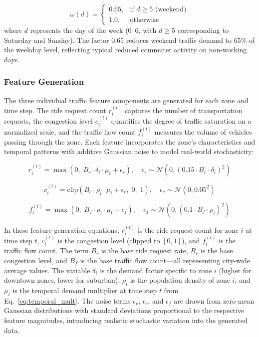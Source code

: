 \documentclass[journal]{IEEEtran}
\begin{document}
\begin{equation}
\omega(d) = 
\begin{cases}
0.65, & \text{if } d \geq 5 \text{ (weekend)} \\
1.0, & \text{otherwise}
\end{cases}
\label{eq:weekend}
\end{equation}
\noindent where $d$ represents the day of the week (0--6, with $d \geq 5$ corresponding to Saturday and Sunday). The factor 0.65 reduces weekend traffic demand to 65\% of the weekday level, reflecting typical reduced commuter activity on non-working days.

\subsubsection{Feature Generation}
The three individual traffic feature components are generated for each zone and time step. The ride request count $r_i^{(t)}$ captures the number of transportation requests, the congestion level $c_i^{(t)}$ quantifies the degree of traffic saturation on a normalized scale, and the traffic flow count $f_i^{(t)}$ measures the volume of vehicles passing through the zone. Each feature incorporates the zone's characteristics and temporal patterns with additive Gaussian noise to model real-world stochasticity:

\begin{equation}
r_i^{(t)} = \max\!\left(0,\; B_r \cdot \delta_i \cdot \mu_t + \epsilon_r\right), \quad \epsilon_r \sim \mathcal{N}(0, (0.15 \cdot B_r \cdot \delta_i)^2)
\label{eq:ride_requests}
\end{equation}

\begin{equation}
c_i^{(t)} = \text{clip}\!\left(B_c \cdot \rho_i \cdot \mu_t + \epsilon_c,\; 0,\; 1\right), \quad \epsilon_c \sim \mathcal{N}(0, 0.05^2)
\label{eq:congestion}
\end{equation}

\begin{equation}
f_i^{(t)} = \max\!\left(0,\; B_f \cdot \rho_i \cdot \mu_t + \epsilon_f\right), \quad \epsilon_f \sim \mathcal{N}(0, (0.1 \cdot B_f \cdot \rho_i)^2)
\label{eq:traffic_flow}
\end{equation}

\noindent In these feature generation equations, $r_i^{(t)}$ is the ride request count for zone $i$ at time step $t$, $c_i^{(t)}$ is the congestion level (clipped to $[0, 1]$), and $f_i^{(t)}$ is the traffic flow count. The term $B_r$ is the base ride request rate, $B_c$ is the base congestion level, and $B_f$ is the base traffic flow count---all representing city-wide average values. The variable $\delta_i$ is the demand factor specific to zone $i$ (higher for downtown zones, lower for suburban), $\rho_i$ is the population density of zone $i$, and $\mu_t$ is the temporal demand multiplier at time step $t$ from Eq.~\ref{eq:temporal_mult}. The noise terms $\epsilon_r$, $\epsilon_c$, and $\epsilon_f$ are drawn from zero-mean Gaussian distributions with standard deviations proportional to the respective feature magnitudes, introducing realistic stochastic variation into the generated data.
\end{document}
